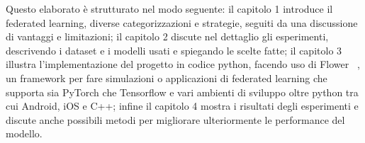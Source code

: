 Questo elaborato è strutturato nel modo seguente: il capitolo 1 
introduce il federated learning, diverse categorizzazioni e strategie, 
seguiti da una discussione di vantaggi e limitazioni; il capitolo 2  
discute nel dettaglio gli esperimenti, descrivendo i dataset e i 
modelli usati e spiegando le scelte fatte; il capitolo 3 illustra 
l'implementazione del progetto in codice python, facendo uso di Flower
~\cite{flowerai}, un framework per fare simulazioni o applicazioni
di federated learning che supporta 
sia PyTorch che Tensorflow e vari ambienti di 
sviluppo oltre python tra cui Android, iOS e C++; infine il capitolo 4
mostra i risultati degli esperimenti e discute anche possibili metodi 
per migliorare ulteriormente le performance del modello.

